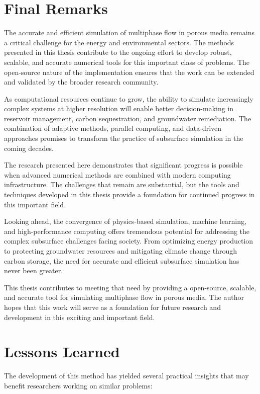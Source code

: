 \section{Final Remarks}
\label{sec:conclusion:remarks}

The accurate and efficient simulation of multiphase flow in porous media remains a critical challenge for the energy and environmental sectors. The methods presented in this thesis contribute to the ongoing effort to develop robust, scalable, and accurate numerical tools for this important class of problems. The open-source nature of the implementation ensures that the work can be extended and validated by the broader research community.

As computational resources continue to grow, the ability to simulate increasingly complex systems at higher resolution will enable better decision-making in reservoir management, carbon sequestration, and groundwater remediation. The combination of adaptive methods, parallel computing, and data-driven approaches promises to transform the practice of subsurface simulation in the coming decades.

The research presented here demonstrates that significant progress is possible when advanced numerical methods are combined with modern computing infrastructure. The challenges that remain are substantial, but the tools and techniques developed in this thesis provide a foundation for continued progress in this important field.

Looking ahead, the convergence of physics-based simulation, machine learning, and high-performance computing offers tremendous potential for addressing the complex subsurface challenges facing society. From optimizing energy production to protecting groundwater resources and mitigating climate change through carbon storage, the need for accurate and efficient subsurface simulation has never been greater.

This thesis contributes to meeting that need by providing a open-source, scalable, and accurate tool for simulating multiphase flow in porous media. The author hopes that this work will serve as a foundation for future research and development in this exciting and important field.

\section{Lessons Learned}
\label{sec:conclusion:lessons}

The development of this method has yielded several practical insights that may benefit researchers working on similar problems:

